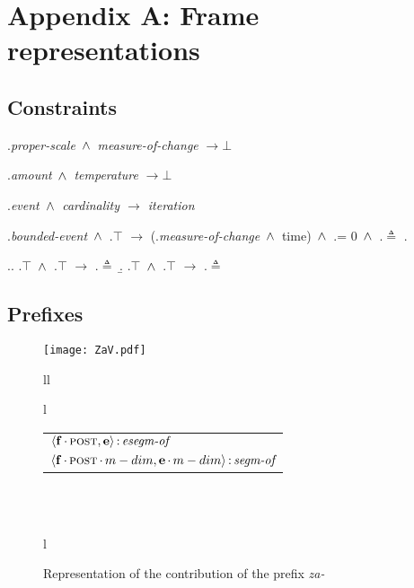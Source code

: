 
\chapter{Appendix A: Frame representations}
\label{AppendixA}
\section{Constraints}\label{app:constraints}
\ex.\label{app:const:proper}\textit{proper-scale} $\,\wedge\,$ \textit{measure-of-change} $\rightarrow \bot$

\ex.\label{app:const:temp:amount}\textit{amount} $\,\wedge\,$ \textit{temperature} $\rightarrow \bot$

\ex.\label{app:const:card}\textit{event $\,\wedge\,$ cardinality $\rightarrow$ iteration}

\ex.\label{app:constr:duration}\textit{bounded-event} $\,\wedge\,$ \DURATION .$\top$ $\rightarrow$ (\MDIM .\textit{measure-of-change} $\,\wedge\,$ time) $\,\wedge\,$  \MDIM .\MIN = 0 $\,\wedge\,$ \MDIM .\MAX $\triangleq$ \DURATION .\VAL

\ex.\label{app:rule:minmaxevent}\a. \MIN .$\top$ $\,\wedge\,$ \INIT .$\top$ $\rightarrow$ \INIT .\POS $\triangleq$ \MIN
\b. \MAX .$\top$ $\,\wedge\,$ \FIN .$\top$ $\rightarrow$ \FIN .\POS $\triangleq$ \MAX

\section{Prefixes}\label{app:pref}

\begin{figure}[H]
\centering
\texttt{[image: ZaV.pdf]}\\
\begin{tabular}[t]{ll}
\begin{tabular}[t]{l}
\end{tabular}
\begin{footnotesize}
\begin{tabular}[t]{l}
$\langle{\textbf{\textrm{f}}\,{\cdot}\,\textsc{post},\textbf{\textrm{e}}}\rangle\,{:}\,\textit{esegm-of}$\\[1ex]
$\tuple{\btag{f}\BC\POST\C\MDIM,\btag{e}\BC\MDIM}\D\type{segm-of}$\\
\end{tabular}
\end{footnotesize}
\\\\
\begin{tabular}[t]{l}
\hfill
\end{tabular}
\end{tabular}
\hfill
\caption{Representation of the contribution of the prefix \textit{za-}}
\label{app:za.frame.semantics}
\end{figure}

